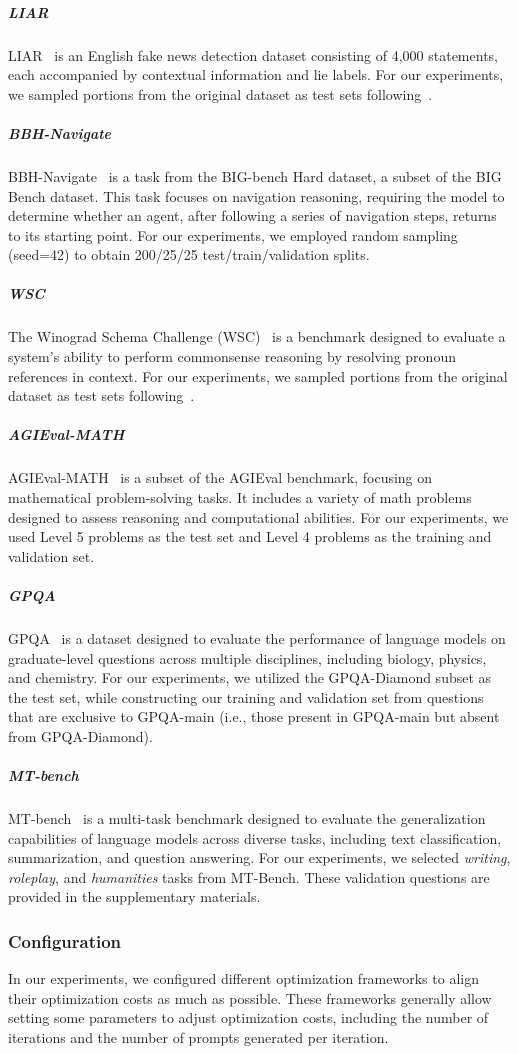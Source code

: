 \subparagraph{LIAR}
LIAR~\cite{william2017liar} is an English fake news detection dataset consisting of 4,000 statements, each accompanied by contextual information and lie labels. For our experiments, we sampled portions from the original dataset as test sets following~\citet{cilin2024erm}.
\subparagraph{BBH-Navigate}
BBH-Navigate~\cite{mirac2023bbh} is a task from the BIG-bench Hard dataset, a subset of the BIG Bench dataset. This task focuses on navigation reasoning, requiring the model to determine whether an agent, after following a series of navigation steps, returns to its starting point. For our experiments, we employed random sampling (seed=42) to obtain 200/25/25 test/train/validation splits.
\subparagraph{WSC}
The Winograd Schema Challenge (WSC)~\cite{hector2012wsc} is a benchmark designed to evaluate a system's ability to perform commonsense reasoning by resolving pronoun references in context. For our experiments, we sampled portions from the original dataset as test sets following~\citet{cilin2024erm}.
\subparagraph{AGIEval-MATH}
AGIEval-MATH~\cite{wan2024agieval} is a subset of the AGIEval benchmark, focusing on mathematical problem-solving tasks. It includes a variety of math problems designed to assess reasoning and computational abilities. For our experiments, we used Level 5 problems as the test set and Level 4 problems as the training and validation set.
\subparagraph{GPQA}
GPQA~\cite{david2023gpqa} is a dataset designed to evaluate the performance of language models on graduate-level questions across multiple disciplines, including biology, physics, and chemistry. For our experiments, we utilized the GPQA-Diamond subset as the test set, while constructing our training and validation set from questions that are exclusive to GPQA-main (i.e., those present in GPQA-main but absent from GPQA-Diamond).
\subparagraph{MT-bench}
MT-bench~\cite{lianmin2023mtbench} is a multi-task benchmark designed to evaluate the generalization capabilities of language models across diverse tasks, including text classification, summarization, and question answering. For our experiments, we selected \textit{writing}, \textit{roleplay}, and \textit{humanities} tasks from MT-Bench. These validation questions are provided in the supplementary materials.



\subsubsection{Configuration}
In our experiments, we configured different optimization frameworks to align their optimization costs as much as possible. These frameworks generally allow setting some parameters to adjust optimization costs, including the number of iterations and the number of prompts generated per iteration. 



